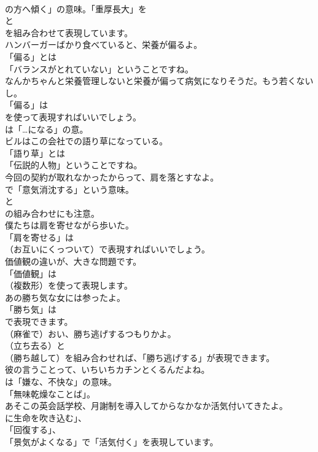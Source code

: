 \documentclass[8pt]{extreport}
\begin{document}
\begin{CJK}{UTF8}{min}
\\	の方へ傾く」の意味。「重厚長大」を
\\	と
\\	を組み合わせて表現しています。	
\\	ハンバーガーばかり食べていると、栄養が偏るよ。 
\\	「偏る」とは
\\	「バランスがとれていない」ということですね。	
\\	なんかちゃんと栄養管理しないと栄養が偏って病気になりそうだ。もう若くないし。 
\\	「偏る」は 
\\	を使って表現すればいいでしょう。
\\	は「…になる」の意。	
\\	ビルはこの会社での語り草になっている。 
\\	「語り草」とは
\\	「伝説的人物」ということですね。	
\\	今回の契約が取れなかったからって、肩を落とすなよ。 
\\	で「意気消沈する」という意味。
\\	と 
\\	の組み合わせにも注意。	
\\	僕たちは肩を寄せながら歩いた。 
\\	「肩を寄せる」は 
\\	（お互いにくっついて）で表現すればいいでしょう。	
\\	価値観の違いが、大きな問題です。 
\\	「価値観」は
\\	（複数形）を使って表現します。	
\\	あの勝ち気な女には参ったよ。 
\\	「勝ち気」は
\\	で表現できます。	
\\	（麻雀で）おい、勝ち逃げするつもりかよ。 
\\	（立ち去る）と
\\	（勝ち越して）を組み合わせれば、「勝ち逃げする」が表現できます。	
\\	彼の言うことって、いちいちカチンとくるんだよね。 
\\	は「嫌な、不快な」の意味。
\\	「無味乾燥なことば」。	
\\	あそこの英会話学校、月謝制を導入してからなかなか活気付いてきたよ。 
\\	に生命を吹き込む」、
\\	「回復する」、
\\	「景気がよくなる」で「活気付く」を表現しています。	

\end{CJK}
\end{document}
